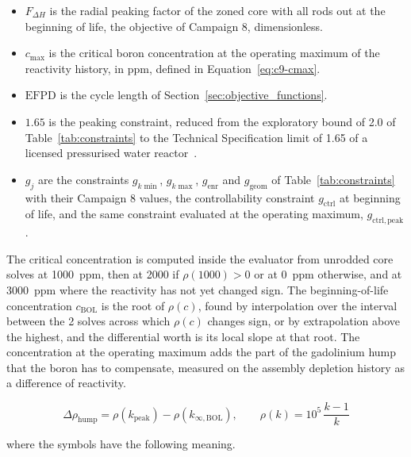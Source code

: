\begin{itemize}
  \item $F_{\Delta H}$ is the radial peaking factor of the zoned core
        with all rods out at the beginning of life, the objective of
        Campaign 8, dimensionless.

  \item $c_\mathrm{max}$ is the critical boron concentration at the
        operating maximum of the reactivity history, in ppm, defined in
        Equation~\eqref{eq:c9-cmax}.

  \item $\mathrm{EFPD}$ is the cycle length of
        Section~\ref{sec:objective_functions}.

  \item $1.65$ is the peaking constraint, reduced from the exploratory
        bound of 2.0 of Table~\ref{tab:constraints} to the Technical
        Specification limit of 1.65 of a licensed pressurised water
        reactor~\cite{robinson_gd10}.

  \item $g_j$ are the constraints $g_{k\min}$, $g_{k\max}$,
        $g_\mathrm{enr}$ and $g_\mathrm{geom}$ of
        Table~\ref{tab:constraints} with their Campaign 8 values, the
        controllability constraint $g_\mathrm{ctrl}$ at beginning of life, and the
        same constraint evaluated at the operating maximum,
        $g_\mathrm{ctrl,peak}$.
\end{itemize}

The critical concentration is computed inside the evaluator from
unrodded core solves at \SI{1000}{ppm}, then at 2000 if $\rho(1000) > 0$
or at \SI{0}{ppm} otherwise, and at \SI{3000}{ppm} where the reactivity
has not yet changed sign. The beginning-of-life concentration
$c_\mathrm{BOL}$ is the root of $\rho(c)$, found by interpolation
over the interval between the 2 solves across which $\rho(c)$
changes sign, or by extrapolation above the highest,
and the differential worth is its local slope at that root. The
concentration at the operating maximum adds the part of the gadolinium
hump that the boron has to compensate, measured on the assembly depletion
history as a difference of reactivity.

\begin{equation}
\Delta\rho_\mathrm{hump} = \rho(k_\mathrm{peak}) - \rho(k_{\infty,\mathrm{BOL}}),
\qquad \rho(k) = 10^5\,\frac{k-1}{k}
\label{eq:c7-hump}
\end{equation}

\noindent where the symbols have the following meaning.

